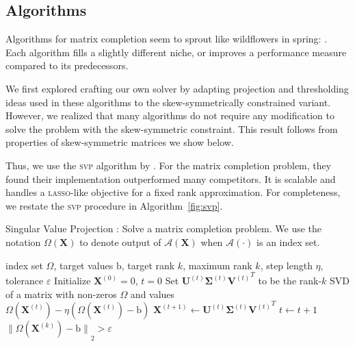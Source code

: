 \documentclass{sig-alternate}
\renewcommand{\cite}{\citep}
\newcommand{\sA}{\mathcal{A}}
\newcommand{\algo}[1]{\textsc{\lowercase{#1}}}
\newcommand{\itn}[1]{^{(#1)}}
\newcommand{\eps}{\varepsilon}
\newcommand{\mat}{\boldsymbol}
\renewcommand{\vec}[1]{\boldsymbol{\mathrm{#1}}}
\providecommand{\mSigma}{\ensuremath{\mat{\Sigma}}}
\providecommand{\mU}{\ensuremath{\mat{U}}}
\providecommand{\mV}{\ensuremath{\mat{V}}}
\providecommand{\mX}{\ensuremath{\mat{X}}}
\providecommand{\vb}{\ensuremath{\vec{b}}}
\newcommand{\nstretchsym}[3]{\ensuremath{#1 #3 #2}}
\newcommand{\nnormof}[2][]{\nstretchsym{\|}{\|}{#2}_{#1}}
\begin{document}
\subsection{Algorithms} \label{sec:mc-algs}

Algorithms for matrix completion
seem to sprout like wildflowers in spring:
\citet{lee2009-admira,cai2008-svt,toh2009-proximal-gradient,dai2009-set,keshavan2009-grassman,mazumder2009-regularization,Jain-2010-SVP}.  Each algorithm
fills a slightly different niche, or improves a performance measure 
compared to its predecessors.  

We first explored crafting our own solver by adapting projection and
thresholding ideas used in these algorithms to the skew-symmetrically
constrained variant.  However, we realized that many algorithms
do not require any modification to solve the problem with the 
skew-symmetric constraint.  This result follows from
properties of skew-symmetric matrices we show below.

Thus, we use the \algo{svp} algorithm by \citet{Jain-2010-SVP}.  
For the matrix completion problem, they found their implementation
outperformed many competitors.  It is scalable
and handles a \algo{lasso}-like objective for a fixed rank approximation.
For completeness, we restate the \algo{svp} procedure in Algorithm~\ref{fig:svp}.

\begin{algorithm} \raggedright
 \caption{Singular Value Projection \cite{Jain-2010-SVP}:
 Solve a matrix completion problem.  We use
  the notation $\Omega(\mX)$ to denote output of 
  $\sA(\mX)$ when $\sA(\cdot)$ is an index set.}
 \label{fig:svp}
 \begin{algorithmic}[1]
  \REQUIRE index set $\Omega$, target values $\vb$, target rank $k$, maximum rank $k$, step length $\eta$, tolerance $\eps$
  \STATE Initialize $\mX\itn{0} = 0$, $t=0$
  \REPEAT 
    \STATE Set $ \mU\itn{t} \mSigma\itn{t} {\mV\itn{t}}^T$ to be 
        the rank-$k$ SVD of a matrix with 
        non-zeros $\Omega$ and values\\ 
        $\Omega(\mX\itn{t}) - \eta (\Omega(\mX\itn{t}) - \vb)$
    \STATE $\mX\itn{t+1} \leftarrow \mU\itn{t} \mSigma\itn{t} {\mV\itn{t}}^T$
    \STATE $t \leftarrow t+1$
  \UNTIL $\nnormof[2]{\Omega(\mX\itn{k}) - \vb} > \eps$
 \end{algorithmic}

\end{algorithm}


\label{sec:mc-algs-ss}
\end{document}
